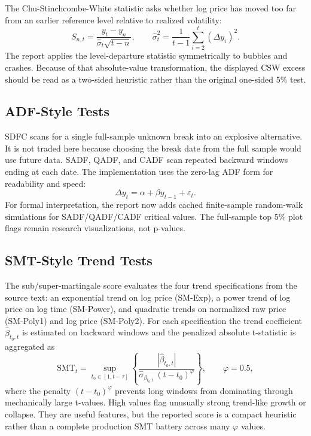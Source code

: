 \documentclass[11pt]{article}
\begin{document}
The Chu-Stinchcombe-White statistic asks whether log price has moved too far from an earlier reference level relative to realized volatility:
\[
    S_{n,t} = \frac{y_t-y_n}{\hat\sigma_t\sqrt{t-n}},
    \qquad
    \hat\sigma_t^2 = \frac{1}{t-1}\sum_{i=2}^t (\Delta y_i)^2.
\]
The report applies the level-departure statistic symmetrically to bubbles and crashes. Because of that absolute-value transformation, the displayed CSW excess should be read as a two-sided heuristic rather than the original one-sided 5\% test.

\subsection{ADF-Style Tests}

SDFC scans for a single full-sample unknown break into an explosive alternative. It is not traded here because choosing the break date from the full sample would use future data. SADF, QADF, and CADF scan repeated backward windows ending at each date. The implementation uses the zero-lag ADF form for readability and speed:
\[
    \Delta y_t = \alpha + \beta y_{t-1} + \varepsilon_t.
\]
For formal interpretation, the report now adds cached finite-sample random-walk simulations for SADF/QADF/CADF critical values. The full-sample top 5\% plot flags remain research visualizations, not p-values.

\subsection{SMT-Style Trend Tests}

The sub/super-martingale score evaluates the four trend specifications from the source text: an exponential trend on log price (SM-Exp), a power trend of log price on log time (SM-Power), and quadratic trends on normalized raw price (SM-Poly1) and log price (SM-Poly2). For each specification the trend coefficient $\hat\beta_{t_0,t}$ is estimated on backward windows and the penalized absolute t-statistic is aggregated as
\[
    \mathrm{SMT}_t = \sup_{t_0 \in [1, t-\tau]}
    \left\{ \frac{\left|\hat\beta_{t_0,t}\right|}{\hat\sigma_{\beta_{t_0,t}}\,(t - t_0)^{\varphi}} \right\},
    \qquad \varphi = 0.5,
\]
where the penalty $(t-t_0)^{\varphi}$ prevents long windows from dominating through mechanically large t-values. High values flag unusually strong trend-like growth or collapse. They are useful features, but the reported score is a compact heuristic rather than a complete production SMT battery across many $\varphi$ values.
\end{document}
